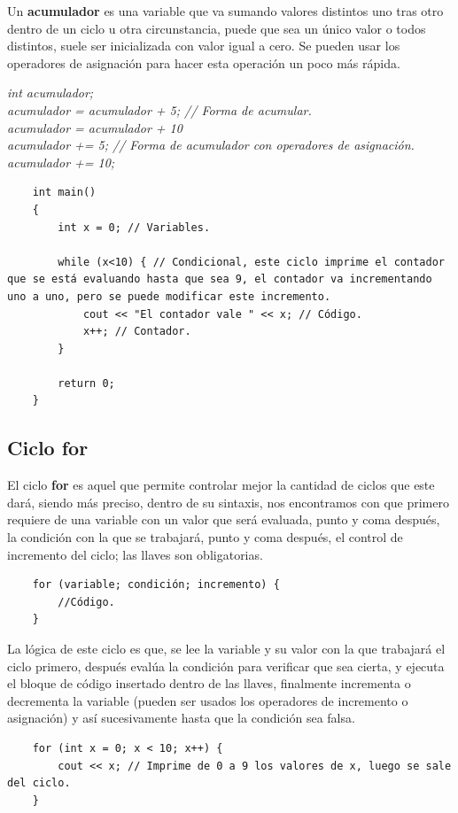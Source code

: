 Un \textbf{acumulador} es una variable que va sumando valores distintos uno tras otro dentro de un ciclo u otra circunstancia, puede que sea un único valor o todos distintos, suele ser inicializada con valor igual a cero. Se pueden usar los operadores de asignación para hacer esta operación un poco más rápida.
\begin{center}
	\textit{
		int acumulador; \\
		acumulador = acumulador + 5; // Forma de acumular. \\
		acumulador = acumulador + 10\\acumulador += 5; // Forma de acumulador con operadores de asignación. \\
		acumulador += 10;
	}
\end{center}
\begin{lstlisting}
    int main()
    {
        int x = 0; // Variables.
        
        while (x<10) { // Condicional, este ciclo imprime el contador que se está evaluando hasta que sea 9, el contador va incrementando uno a uno, pero se puede modificar este incremento.
            cout << "El contador vale " << x; // Código.
            x++; // Contador.
        }
        
        return 0;
    }
\end{lstlisting}


\subsection{Ciclo for}
\hspace{0.55cm}El ciclo \textbf{for} es aquel que permite controlar mejor la cantidad de ciclos que este dará, siendo más preciso, dentro de su sintaxis, nos encontramos con que primero requiere de una variable con un valor que será evaluada, punto y coma después, la condición con la que se trabajará, punto y coma después, el control de incremento del ciclo; las llaves son obligatorias.
\begin{lstlisting}
    for (variable; condición; incremento) {
        //Código.
    }
\end{lstlisting}

La lógica de este ciclo es que, se lee la variable y su valor con la que trabajará el ciclo primero, después evalúa la condición para verificar que sea cierta, y ejecuta el bloque de código insertado dentro de las llaves, finalmente incrementa o decrementa la variable (pueden ser usados los operadores de incremento o asignación) y así sucesivamente hasta que la condición sea falsa.
\begin{lstlisting}
    for (int x = 0; x < 10; x++) {
        cout << x; // Imprime de 0 a 9 los valores de x, luego se sale del ciclo.
    }
\end{lstlisting}


